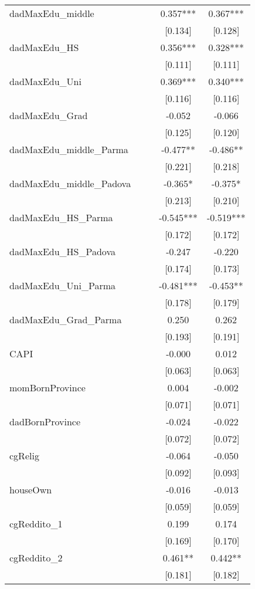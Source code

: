 \documentclass[]{article}
\begin{document}
\begin{tabular}{lcccc}
dadMaxEdu\_middle &  &  & 0.357*** & 0.367*** \\
 &  &  & [0.134] & [0.128] \\
dadMaxEdu\_HS &  &  & 0.356*** & 0.328*** \\
 &  &  & [0.111] & [0.111] \\
dadMaxEdu\_Uni &  &  & 0.369*** & 0.340*** \\
 &  &  & [0.116] & [0.116] \\
dadMaxEdu\_Grad &  &  & -0.052 & -0.066 \\
 &  &  & [0.125] & [0.120] \\
dadMaxEdu\_middle\_Parma &  &  & -0.477** & -0.486** \\
 &  &  & [0.221] & [0.218] \\
dadMaxEdu\_middle\_Padova &  &  & -0.365* & -0.375* \\
 &  &  & [0.213] & [0.210] \\
dadMaxEdu\_HS\_Parma &  &  & -0.545*** & -0.519*** \\
 &  &  & [0.172] & [0.172] \\
dadMaxEdu\_HS\_Padova &  &  & -0.247 & -0.220 \\
 &  &  & [0.174] & [0.173] \\
dadMaxEdu\_Uni\_Parma &  &  & -0.481*** & -0.453** \\
 &  &  & [0.178] & [0.179] \\
dadMaxEdu\_Grad\_Parma &  &  & 0.250 & 0.262 \\
 &  &  & [0.193] & [0.191] \\
CAPI &  &  & -0.000 & 0.012 \\
 &  &  & [0.063] & [0.063] \\
momBornProvince &  &  & 0.004 & -0.002 \\
 &  &  & [0.071] & [0.071] \\
dadBornProvince &  &  & -0.024 & -0.022 \\
 &  &  & [0.072] & [0.072] \\
cgRelig &  &  & -0.064 & -0.050 \\
 &  &  & [0.092] & [0.093] \\
houseOwn &  &  & -0.016 & -0.013 \\
 &  &  & [0.059] & [0.059] \\
cgReddito\_1 &  &  & 0.199 & 0.174 \\
 &  &  & [0.169] & [0.170] \\
cgReddito\_2 &  &  & 0.461** & 0.442** \\
 &  &  & [0.181] & [0.182] \\

\end{tabular}
\end{document}
